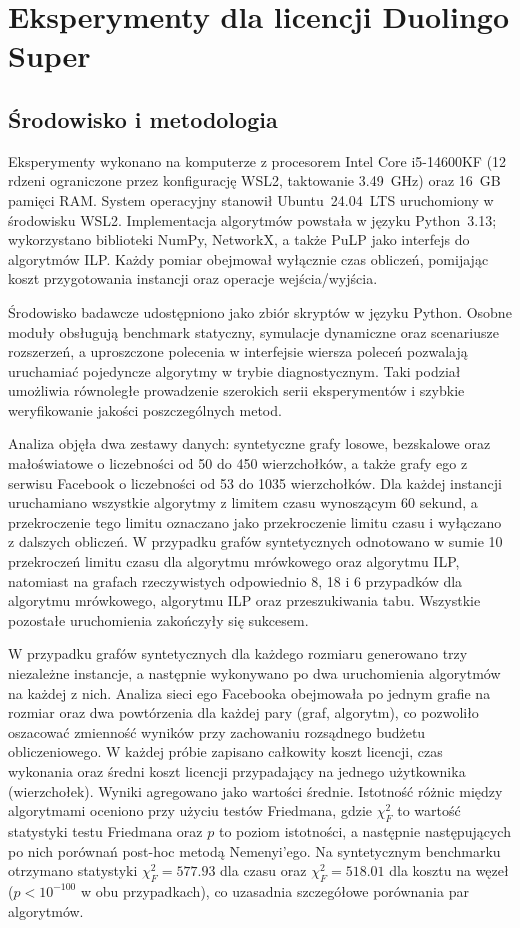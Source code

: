 \chapter{Eksperymenty dla licencji Duolingo Super}
\label{chap:experiments}
\section{Środowisko i metodologia}

Eksperymenty wykonano na komputerze z procesorem Intel Core i5-14600KF (12 rdzeni ograniczone przez konfigurację WSL2, taktowanie 3.49~GHz) oraz 16~GB pamięci RAM. System operacyjny stanowił Ubuntu~24.04~LTS uruchomiony w środowisku WSL2. Implementacja algorytmów powstała w języku Python~3.13; wykorzystano biblioteki NumPy, NetworkX, a także PuLP jako interfejs do algorytmów ILP. Każdy pomiar obejmował wyłącznie czas obliczeń, pomijając koszt przygotowania instancji oraz operacje wejścia/wyjścia.

Środowisko badawcze udostępniono jako zbiór skryptów w języku Python. Osobne moduły obsługują benchmark statyczny, symulacje dynamiczne oraz scenariusze rozszerzeń, a uproszczone polecenia w interfejsie wiersza poleceń pozwalają uruchamiać pojedyncze algorytmy w trybie diagnostycznym. Taki podział umożliwia równoległe prowadzenie szerokich serii eksperymentów i szybkie weryfikowanie jakości poszczególnych metod.

Analiza objęła dwa zestawy danych: syntetyczne grafy losowe, bezskalowe oraz małoświatowe o liczebności od 50 do 450 wierzchołków, a także grafy ego z serwisu Facebook o liczebności od 53 do 1035 wierzchołków. Dla każdej instancji uruchamiano wszystkie algorytmy z limitem czasu wynoszącym 60 sekund, a przekroczenie tego limitu oznaczano jako przekroczenie limitu czasu i wyłączano z dalszych obliczeń. W przypadku grafów syntetycznych odnotowano w sumie 10 przekroczeń limitu czasu dla algorytmu mrówkowego oraz algorytmu ILP, natomiast na grafach rzeczywistych odpowiednio 8, 18 i 6 przypadków dla algorytmu mrówkowego, algorytmu ILP oraz przeszukiwania tabu. Wszystkie pozostałe uruchomienia zakończyły się sukcesem.

W przypadku grafów syntetycznych dla każdego rozmiaru generowano trzy niezależne instancje, a następnie wykonywano po dwa uruchomienia algorytmów na każdej z nich. Analiza sieci ego Facebooka obejmowała po jednym grafie na rozmiar oraz dwa powtórzenia dla każdej pary (graf, algorytm), co pozwoliło oszacować zmienność wyników przy zachowaniu rozsądnego budżetu obliczeniowego. W każdej próbie zapisano całkowity koszt licencji, czas wykonania oraz średni koszt licencji przypadający na jednego użytkownika (wierzchołek). Wyniki agregowano jako wartości średnie. Istotność różnic między algorytmami oceniono przy użyciu testów Friedmana, gdzie $\chi^2_F$ to wartość statystyki testu Friedmana oraz $p$ to poziom istotności, a następnie następujących po nich porównań post-hoc metodą Nemenyi'ego. Na syntetycznym benchmarku otrzymano statystyki $\chi^2_F = 577.93$ dla czasu oraz $\chi^2_F = 518.01$ dla kosztu na węzeł ($p < 10^{-100}$ w obu przypadkach), co uzasadnia szczegółowe porównania par algorytmów.

